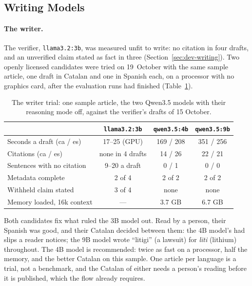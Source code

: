 
\subsection{Writing Models}

\paragraph{The writer.}
\label{subsec:results-writing-trial}
The verifier, \texttt{llama3.2:3b}, was measured unfit to write: no
citation in four drafts, and an unverified claim stated as fact in three
(Section~\ref{sec:dev-writing}). Two openly licensed candidates were
tried on 19~October with the same sample article, one draft in Catalan
and one in Spanish each, on a processor with no graphics card, after
the evaluation runs had finished (Table~\ref{tab:writer-trial}).

\begin{table}[ht]
\centering
\small
\begin{tabular}{@{}lccc@{}}
\toprule
& \texttt{llama3.2:3b} & \texttt{qwen3.5:4b} & \texttt{qwen3.5:9b} \\
\midrule
Seconds a draft (ca / es) & 17--25 (GPU) & 169 / 208 & 351 / 256 \\
Citations (ca / es) & none in 4 drafts & 14 / 26 & 22 / 21 \\
Sentences with no citation & 9--20 a draft & 0 / 1 & 0 / 0 \\
Metadata complete & 2 of 4 & 2 of 2 & 2 of 2 \\
Withheld claim stated & 3 of 4 & none & none \\
Memory loaded, 16k context & --- & 3.7 GB & 6.7 GB \\
\bottomrule
\end{tabular}
\caption[The writer trial]{The writer trial: one sample article, the
two Qwen3.5 models with their reasoning mode off, against the
verifier's drafts of 15 October.}
\label{tab:writer-trial}
\end{table}

Both candidates fix what ruled the 3B model out. Read by a person, their
Spanish was good, and their Catalan decided between them: the 4B model's
had slips a reader notices; the 9B model wrote ``litigi'' (a lawsuit)
for \emph{liti} (lithium) throughout. The 4B model is recommended:
twice as fast on a processor, half the memory, and the better Catalan
on this sample. One article per language is a trial, not a benchmark,
and the Catalan of either needs a person's reading before it is
published, which the flow already requires.

